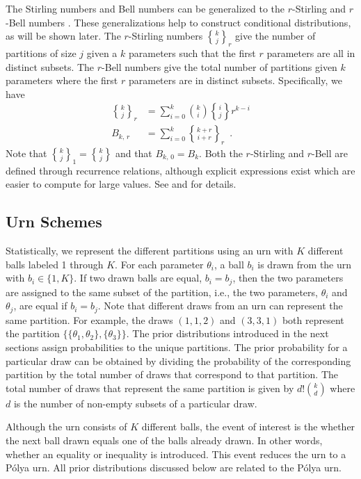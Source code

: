 \documentclass[11pt,a4paper]{article}
\theoremstyle{definition} %
\theoremstyle{case}
\DeclareRobustCommand{\stirling}{\genfrac\{\}{0pt}{}}
\newcommand{\rstirling}[3]{\stirling{#1}{#2}_{#3}}
\newcommand{\bellnum}[1]{B_{#1}}
\newcommand{\rbellnum}[2]{B_{#1,\,#2}}
\begin{document}
The Stirling numbers and Bell numbers can be generalized to the $r$-Stirling \parencite{broder1984r} and $r$-Bell numbers \parencite{mezo2011r}. These generalizations help to construct conditional distributions, as will be shown later. The $r$-Stirling numbers $\rstirling{k}{j}{r}$ give the number of partitions of size $j$ given a $k$ parameters such that the first $r$ parameters are all in distinct subsets. The $r$-Bell numbers give the total number of partitions given $k$ parameters where the first $r$ parameters are in distinct subsets. Specifically, we have
\begin{align}
    \rstirling{k}{j}{r} &= \sum_{i=0}^k \binom{k}{i}\stirling{i}{j}r^{k-i}\\
    \rbellnum{k}{r} &= \sum_{i=0}^k \rstirling{k+r}{i+r}{r} \enspace .
\end{align}
Note that $\rstirling{k}{j}{1} = \stirling{k}{j}$ and that $\rbellnum{k}{0} = \bellnum{k}$. Both the $r$-Stirling and $r$-Bell are defined through recurrence relations, although explicit expressions exist which are easier to compute for large values. See \textcite{broder1984r} and \textcite{mezo2011r} for details.

\subsection{Urn Schemes}
Statistically, we represent the different partitions using an urn with $K$ different balls labeled 1 through $K$. For each parameter $\theta_i$, a ball $b_i$ is drawn from the urn with $b_i \in \{1,K\}$. If two drawn balls are equal, $b_i = b_j$, then the two parameters are assigned to the same subset of the partition, i.e., the two parameters, $\theta_i$ and $\theta_j$, are equal if $b_i = b_j$. Note that different draws from an urn can represent the same partition. For example, the draws $(1, 1, 2)$ and $(3, 3, 1)$ both represent the partition $\{\{\theta_1, \theta_2\}, \{\theta_3\}\}$. The prior distributions introduced in the next sections assign probabilities to the unique partitions. The prior probability for a particular draw can be obtained by dividing the probability of the corresponding partition by the total number of draws that correspond to that partition. The total number of draws that represent the same partition is given by $d!\binom{k}{d}$ where $d$ is the number of non-empty subsets of a particular draw. 

Although the urn consists of $K$ different balls, the event of interest is the whether the next ball drawn equals one of the balls already drawn. In other words, whether an equality or inequality is introduced. This event reduces the urn to a P\'{o}lya urn. All prior distributions discussed below are related to the P\'{o}lya urn.
\end{document}
